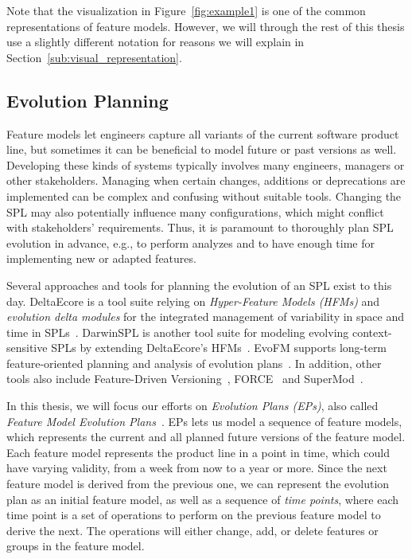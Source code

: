 \documentclass[a4paper,english]{ifimaster}
\begin{document}
Note that the visualization in Figure~\vref{fig:example1} is one of the common representations of feature models. However, we will through the rest of this thesis use a slightly different notation for reasons we will explain in Section~\vref{sub:visual_representation}.

\subsection{Evolution Planning}%
\label{sub:evolution_planning}

Feature models let engineers capture all variants of the current software product line, but sometimes it can be beneficial to model future or past versions as well. Developing these kinds of systems typically involves many engineers, managers or other stakeholders. Managing when certain changes, additions or deprecations are implemented can be complex and confusing without suitable tools. Changing the SPL may also potentially influence many configurations, which might conflict with stakeholders' requirements. Thus, it is paramount to thoroughly plan SPL evolution in advance, e.g., to perform analyzes and to have enough time for implementing new or adapted features.

Several approaches and tools for planning the evolution of an SPL exist to this day. DeltaEcore is a tool suite relying on \textit{Hyper-Feature Models (HFMs)} and \textit{evolution delta modules} for the integrated management of variability in space and time in SPLs~\cite{cite:s02_deltaecore}. DarwinSPL is another tool suite for modeling evolving context-sensitive SPLs by extending DeltaEcore's HFMs~\cite{cite:s17_darwinspl}. EvoFM supports long-term feature-oriented planning and analysis of evolution plans~\cite{cite:evofm_fm_planning}. In addition, other tools also include Feature-Driven Versioning~\cite{cite:feature_driven_versioning}, FORCE~\cite{cite:force} and SuperMod~\cite{cite:supermod}.

In this thesis, we will focus our efforts on \textit{Evolution Plans (EPs)}, also called \textit{Feature Model Evolution Plans}~\cite{cite:consistency_preserving_evolution_planning}. EPs lets us model a sequence of feature models, which represents the current and all planned future versions of the feature model. Each feature model represents the product line in a point in time, which could have varying validity, from a week from now to a year or more. Since the next feature model is derived from the previous one, we can represent the evolution plan as an initial feature model, as well as a sequence of \textit{time points}, where each time point is a set of operations to perform on the previous feature model to derive the next. The operations will either change, add, or delete features or groups in the feature model.
\end{document}
